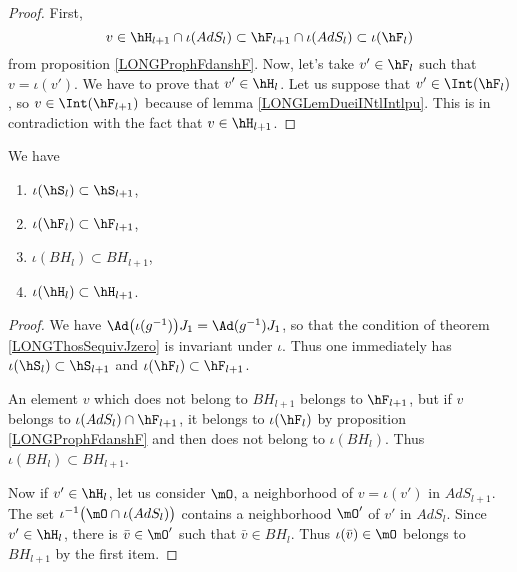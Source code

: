 \begin{proof}
	First,
	\begin{equation}
		v\in\hH_{l+1}\cap\iota(AdS_l)\subset\hF_{l+1}\cap\iota(AdS_l)\subset\iota(\hF_l)
	\end{equation}
	from proposition \ref{LONGProphFdanshF}. Now, let's take $v'\in\hF_l$ such that $v=\iota(v')$. We have to prove that $v'\in\hH_l$. Let us suppose that $v'\in\Int(\hF_l)$, so $v\in\Int(\hF_{l+1})$ because of lemma \ref{LONGLemDueiINtlIntlpu}. This is in contradiction with the fact that $v\in\hH_{l+1}$.
\end{proof}

\begin{corollary}		\label{LONGCorDeuxTrucsBHhH}
	We have
	\begin{multicols}{2}
		\begin{enumerate}

		\item
			$\iota(\hS_l)\subset\hS_{l+1}$,
		\item
			$\iota(\hF_l)\subset\hF_{l+1}$,
		\item
			$\iota(BH_l)\subset BH_{l+1}$,
		\item
			$\iota(\hH_l)\subset \hH_{l+1}$.

		\end{enumerate}
	\end{multicols}
\end{corollary}

\begin{proof}
	We have $\Ad\big( \iota(g^{-1}) \big)J_1=\Ad(g^{-1})J_1$, so that the condition of theorem \eqref{LONGThosSequivJzero} is invariant under $\iota$. Thus one immediately has $\iota(\hS_l)\subset\hS_{l+1}$ and $\iota(\hF_l)\subset\hF_{l+1}$.

	An element $v$ which does not belong to $BH_{l+1}$ belongs to $\hF_{l+1}$, but if $v$ belongs to $\iota(AdS_l)\cap\hF_{l+1}$, it belongs to $\iota(\hF_l)$ by proposition \ref{LONGProphFdanshF} and then does not belong to $\iota(BH_l)$. Thus $\iota(BH_{l})\subset BH_{l+1}$.

	Now if $v'\in\hH_l$, let us consider $\mO$, a neighborhood of $v=\iota(v')$ in $AdS_{l+1}$. The set $\iota^{-1}\big( \mO\cap\iota(AdS_l) \big)$ contains a neighborhood $\mO'$ of $v'$ in $AdS_{l}$. Since $v'\in\hH_l$, there is $\bar v\in\mO'$ such that $\bar v\in BH_l$. Thus $\iota(\bar v)\in\mO$ belongs to $BH_{l+1}$ by the first item.

\end{proof}

